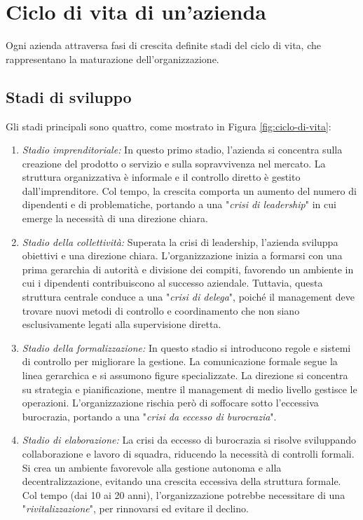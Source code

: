 \chapter{Ciclo di vita di un'azienda}
Ogni azienda attraversa fasi di crescita definite stadi del ciclo di vita, che rappresentano la maturazione dell’organizzazione. 

\section{Stadi di sviluppo}
Gli stadi principali sono quattro, come mostrato in Figura \ref{fig:ciclo-di-vita}:
\begin{enumerate}
    \item \textit{Stadio imprenditoriale:} In questo primo stadio, l’azienda si concentra sulla creazione del prodotto o servizio e sulla sopravvivenza nel mercato. La struttura organizzativa è informale e il controllo diretto è gestito dall’imprenditore. Col tempo, la crescita comporta un aumento del numero di dipendenti e di problematiche, portando a una "\textit{crisi di leadership}" in cui emerge la necessità di una direzione chiara.
    \item \textit{Stadio della collettività:} Superata la crisi di leadership, l’azienda sviluppa obiettivi e una direzione chiara. L’organizzazione inizia a formarsi con una prima gerarchia di autorità e divisione dei compiti, favorendo un ambiente in cui i dipendenti contribuiscono al successo aziendale. Tuttavia, questa struttura centrale conduce a una "\textit{crisi di delega}", poiché il management deve trovare nuovi metodi di controllo e coordinamento che non siano esclusivamente legati alla supervisione diretta.
    \item \textit{Stadio della formalizzazione:} In questo stadio si introducono regole e sistemi di controllo per migliorare la gestione. La comunicazione formale segue la linea gerarchica e si assumono figure specializzate. La direzione si concentra su strategia e pianificazione, mentre il management di medio livello gestisce le operazioni. L’organizzazione rischia però di soffocare sotto l’eccessiva burocrazia, portando a una "\textit{crisi da eccesso di burocrazia}".
    \item \textit{Stadio di elaborazione:} La crisi da eccesso di burocrazia si risolve sviluppando collaborazione e lavoro di squadra, riducendo la necessità di controlli formali. Si crea un ambiente favorevole alla gestione autonoma e alla decentralizzazione, evitando una crescita eccessiva della struttura formale. Col tempo (dai 10 ai 20 anni), l’organizzazione potrebbe necessitare di una "\textit{rivitalizzazione}", per rinnovarsi ed evitare il declino.
\end{enumerate}

